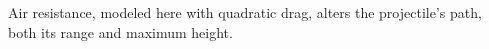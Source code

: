 \documentclass[preview]{standalone}
\begin{document}
\begin{center}
Air resistance, modeled here with quadratic drag, \significantly alters the projectile's path, \reducing both its range and maximum height.
\end{center}
\end{document}
